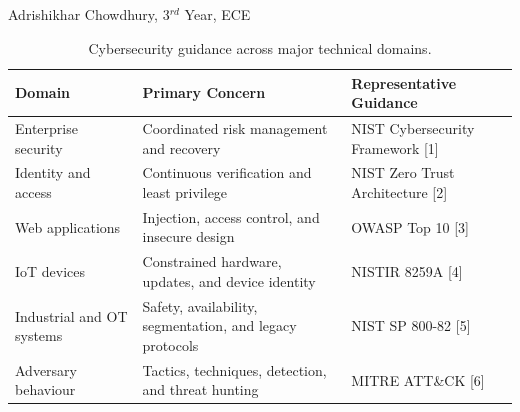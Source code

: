 \begin{center}
  \section{}
  Adrishikhar Chowdhury, 3$^{rd}$ Year, ECE
  \vspace*{-6pt}
\end{center}

\setcounter{figure}{0}
\setcounter{table}{0}

\begin{table}[!b]
\centering
\caption{Cybersecurity guidance across major technical domains.}
\scriptsize
\setlength{\tabcolsep}{4pt}
\renewcommand{\arraystretch}{1.5}
\begin{tabular}{@{}>{\RaggedRight\arraybackslash}p{}
                    >{\RaggedRight\arraybackslash}p{}
                    >{\RaggedRight\arraybackslash}p{}@{}}
\toprule
\textbf{Domain} & \textbf{Primary Concern} & \textbf{Representative Guidance} \\
\midrule
Enterprise security & Coordinated risk management and recovery & NIST Cybersecurity Framework [1] \\
Identity and access & Continuous verification and least privilege & NIST Zero Trust Architecture [2] \\
Web applications & Injection, access control, and insecure design & OWASP Top 10 [3] \\
IoT devices & Constrained hardware, updates, and device identity & NISTIR 8259A [4] \\
Industrial and OT systems & Safety, availability, segmentation, and legacy protocols & NIST SP 800-82 [5] \\
Adversary behaviour & Tactics, techniques, detection, and threat hunting & MITRE ATT\&CK [6] \\
\bottomrule
\end{tabular}
\end{table}

